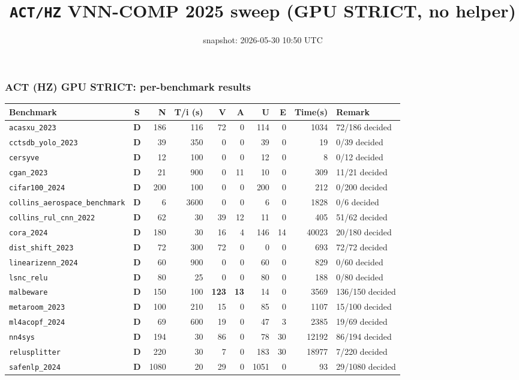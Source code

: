 \documentclass[10pt]{beamer}
\title{\large \texttt{ACT/HZ} VNN-COMP 2025 sweep (GPU STRICT, no helper)}
\date{snapshot: 2026-05-30 10:50 UTC}
\newcommand{\sdone}{{\color{cdone}\textbf{D}}}
\begin{document}
\begin{frame}[fragile]
\frametitle{ACT (HZ) GPU STRICT: per-benchmark results}
\centering\tiny
\setlength{\tabcolsep}{3pt}
\begin{tabular}{l c r r r r r r r l}
\toprule
\textbf{Benchmark} & \textbf{S} & \textbf{N} & \textbf{T/i (s)} & \textbf{V} & \textbf{A} & \textbf{U} & \textbf{E} & \textbf{Time(s)} & \textbf{Remark} \\
\midrule
  \texttt{acasxu\_2023} & \sdone & 186 & 116 & 72 & 0 & 114 & 0 & 1034 & 72/186 decided \\
  \texttt{cctsdb\_yolo\_2023} & \sdone & 39 & 350 & 0 & 0 & 39 & 0 & 19 & 0/39 decided \\
  \texttt{cersyve} & \sdone & 12 & 100 & 0 & 0 & 12 & 0 & 8 & 0/12 decided \\
  \texttt{cgan\_2023} & \sdone & 21 & 900 & 0 & 11 & 10 & 0 & 309 & 11/21 decided \\
  \texttt{cifar100\_2024} & \sdone & 200 & 100 & 0 & 0 & 200 & 0 & 212 & 0/200 decided \\
  \texttt{collins\_aerospace\_benchmark} & \sdone & 6 & 3600 & 0 & 0 & 6 & 0 & 1828 & 0/6 decided \\
  \texttt{collins\_rul\_cnn\_2022} & \sdone & 62 & 30 & 39 & 12 & 11 & 0 & 405 & 51/62 decided \\
  \texttt{cora\_2024} & \sdone & 180 & 30 & 16 & 4 & 146 & 14 & 40023 & 20/180 decided \\
  \texttt{dist\_shift\_2023} & \sdone & 72 & 300 & 72 & 0 & 0 & 0 & 693 & 72/72 decided \\
  \texttt{linearizenn\_2024} & \sdone & 60 & 900 & 0 & 0 & 60 & 0 & 829 & 0/60 decided \\
  \texttt{lsnc\_relu} & \sdone & 80 & 25 & 0 & 0 & 80 & 0 & 188 & 0/80 decided \\
  \texttt{malbeware} & \sdone & 150 & 100 & \textbf{123} & \textbf{13} & 14 & 0 & 3569 & 136/150 decided \\
  \texttt{metaroom\_2023} & \sdone & 100 & 210 & 15 & 0 & 85 & 0 & 1107 & 15/100 decided \\
  \texttt{ml4acopf\_2024} & \sdone & 69 & 600 & 19 & 0 & 47 & 3 & 2385 & 19/69 decided \\
  \texttt{nn4sys} & \sdone & 194 & 30 & 86 & 0 & 78 & 30 & 12192 & 86/194 decided \\
  \texttt{relusplitter} & \sdone & 220 & 30 & 7 & 0 & 183 & 30 & 18977 & 7/220 decided \\
  \texttt{safenlp\_2024} & \sdone & 1080 & 20 & 29 & 0 & 1051 & 0 & 93 & 29/1080 decided \\

\end{tabular}
\end{frame}
\end{document}
